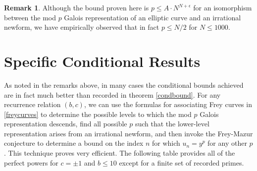 \documentclass[12pt]{amsart}
\theoremstyle{definition}
\newtheorem{rem}[thm]{Remark}
\begin{document}
\begin{rem}
Although the bound proven here is $p\leq A \cdot  N^{N+\epsilon}$ for an isomorphism between the mod $p$ Galois representation of an elliptic curve and an irrational newform, we have empirically observed that in fact $p \leq N/2$ for $N \leq 1000$.
\end{rem}



\section{Specific Conditional Results}

As noted in the remarks above, in many cases the conditional bounds achieved are in fact much better than recorded in theorem \ref{condbound}.  For any recurrence relation $(b,c)$, we can use the formulas for associating Frey curves in \ref{freycurves} to determine the possible levels to which the mod $p$ Galois representation descends, find all possible $p$ such that the lower-level representation arises from an irrational newform, and then invoke the Frey-Mazur conjecture to determine a bound on the index $n$ for which $u_n=y^p$ for any other $p$.  This technique proves very efficient.  The following table provides all of the perfect powers for $c = \pm 1$ and $b \leq 10$ except for a finite set of recorded primes.
\end{document}
